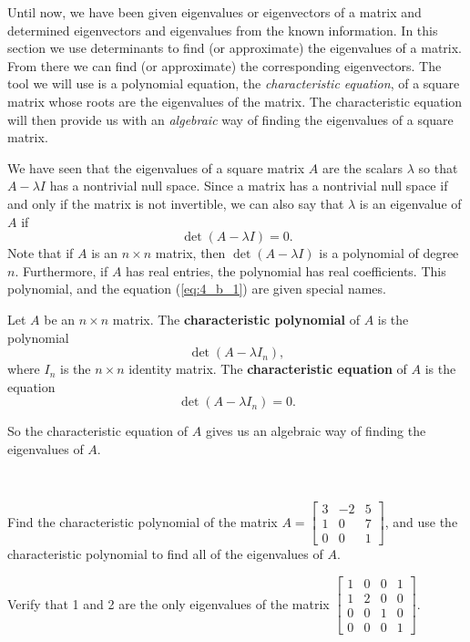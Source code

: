 
Until now, we have been given eigenvalues or eigenvectors of a matrix and determined eigenvectors and eigenvalues from the known information. In this section we use determinants to find (or approximate) the eigenvalues of a matrix. From there we can find (or approximate) the corresponding eigenvectors. The tool we will use is a polynomial equation, the \emph{characteristic equation}, of a square matrix whose roots are the eigenvalues of the matrix. The characteristic equation will then provide us with an \emph{algebraic} way of finding the eigenvalues of a square matrix. 

We have seen that the eigenvalues of a square matrix $A$ are the scalars $\lambda$ so that $A - \lambda I$ has a nontrivial null space. Since a matrix has a nontrivial null space if and only if the matrix is not invertible, we can also say that $\lambda$ is an eigenvalue of $A$ if
\begin{equation}
\det(A - \lambda I) = 0. \label{eq:4_b_1}
\end{equation}
Note that if $A$ is an $n \times n$ matrix, then $\det(A - \lambda I)$ is a polynomial of degree $n$. Furthermore, if $A$ has real entries, the polynomial has real coefficients. This polynomial, and the equation (\ref{eq:4_b_1}) are given special names.



\begin{definition} Let $A$ be an $n \times n$ matrix. The \textbf{characteristic polynomial} of $A$ is the polynomial
\[\det(A-\lambda I_n),\]
where $I_n$ is the $n \times n$ identity matrix. The \textbf{characteristic equation} of $A$ is the equation
\[\det(A-\lambda I_n) = 0.\]
\end{definition}



So the characteristic equation of $A$ gives us an algebraic way of finding the eigenvalues of $A$.



\begin{activity} \label{act:4_b_1} ~
	\ba
	\item Find the characteristic polynomial of the matrix $A = \left[ \begin{array}{crc} 3&-2&5 \\ 1&0&7 \\ 0&0&1 \end{array} \right]$, and use the characteristic polynomial to find all of the eigenvalues of $A$.
	

	
	\item  Verify that 1 and 2 are the only eigenvalues of the matrix $\left[ \begin{array}{cccc} 1&0&0&1\\ 1&2&0&0 \\ 0&0&1&0 \\ 0&0&0&1 \end{array} \right]$.



	\ea
\end{activity}



